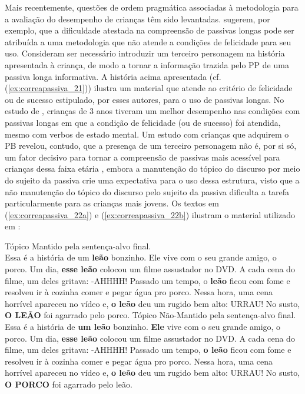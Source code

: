 \documentclass[output=paper]{LSP/langsci}
\begin{document}
Mais recentemente, questões de ordem pragmática associadas à metodologia para a avaliação do desempenho de crianças têm sido levantadas. \citet{obrien_etal2006} sugerem, por exemplo, que a dificuldade atestada na compreensão de passivas longas pode ser atribuída a uma metodologia que não atende a condições de felicidade para seu uso. Consideram ser necessário introduzir um terceiro personagem na história apresentada à criança, de modo a tornar a informação trazida pelo PP de uma passiva longa informativa. A história acima apresentada (cf. (\ref{ex:correapassiva_21})) ilustra um material que atende ao critério de felicidade ou de sucesso estipulado, por esses autores, para o uso de passivas longas. No estudo de \citeauthor{obrien_etal2006}, crianças de 3 anos tiveram um melhor desempenho nas condições com passivas longas em que a condição de felicidade (ou de sucesso) foi atendida, mesmo com verbos de estado mental. Um estudo com crianças que adquirem o PB revelou, contudo, que a presença de um terceiro personagem não é, por si só, um fator decisivo para tornar a compreensão de passivas mais acessível para crianças dessa faixa etária \citep{limajunior2016}, embora a manutenção do tópico do discurso por meio do sujeito da passiva crie uma expectativa para o uso dessa estrutura, visto que a não manutenção do tópico do discurso pelo sujeito da passiva dificulta a tarefa particularmente para as crianças mais jovens\citep{limajunior2016}. 
Os textos em (\ref{ex:correapassiva_22a}) e (\ref{ex:correapassiva_22b}) ilustram o material utilizado em \citet{limajunior2016}: 

\ea\label{ex:correapassiva_22}
\ea\label{ex:correapassiva_22a}
Tópico Mantido pela sentença-alvo final.\\
Essa é a história de um \textbf{leão} bonzinho. Ele vive com o seu grande amigo, o porco. Um dia, \textbf{esse leão} colocou um filme assustador no DVD. A cada cena do filme, um deles gritava: -AHHHH! Passado um tempo, o \textbf{leão} ficou com fome e resolveu ir à cozinha comer e pegar água pro porco. Nessa hora, uma cena horrível apareceu no vídeo e, \textbf{o leão} deu um rugido bem alto: URRAU! No susto, \textbf{O LEÃO} foi agarrado pelo porco.
\ex\label{ex:correapassiva_22b}
Tópico Não-Mantido pela sentença-alvo final.\\
Essa é a história de \textbf{um leão} bonzinho. \textbf{Ele} vive com o seu grande amigo, o porco. Um dia, \textbf{esse leão} colocou um filme assustador no DVD. A cada cena do filme, um deles gritava: -AHHHH! Passado um tempo, \textbf{o leão} ficou com fome e resolveu ir à cozinha comer e pegar água pro porco. Nessa hora, uma cena horrível apareceu no vídeo e, \textbf{o leão} deu um rugido bem alto: URRAU! No susto, \textbf{O PORCO} foi agarrado pelo leão.
\zl
\end{document}
